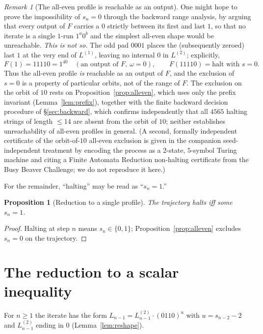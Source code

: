 \documentclass[11pt,reqno]{amsart}
\theoremstyle{plain}
\newtheorem{proposition}{Proposition}
\theoremstyle{definition}
\theoremstyle{remark}
\newtheorem{remark}{Remark}
\begin{document}
\begin{remark}[The all-even profile is reachable as an output]\label{rem:rem18}
One might hope to prove the impossibility of $s_n=0$ through the backward range analysis, by arguing that every output of $F$ carries a $0$ strictly between its first and last $1$, so that no iterate is a single $1$-run $1^a0^b$ and the simplest all-even shape would be unreachable. \emph{This is not so.} The odd pad $0001$ places the (subsequently zeroed) last $1$ at the very end of $L^{(1)}$, leaving no internal $0$ in $L^{(2)}$; explicitly,
\[ F(1)=11110=1^40\quad(\text{an output of }F,\ \omega=0),\qquad F(11110)=\text{halt with }s=0. \]
Thus the all-even profile \emph{is} reachable as an output of $F$, and the exclusion of $s=0$ is a property of particular orbits, not of the range of $F$. The exclusion on the orbit of $10$ rests on Proposition~\ref{prop:alleven}, which uses only the prefix invariant (Lemma~\ref{lem:prefix}), together with the finite backward decision procedure of \S\ref{sec:backward}, which confirms independently that all $4565$ halting strings of length $\le 14$ are absent from the orbit of $10$; neither establishes unreachability of all-even profiles in general. (A second, formally independent certificate of the orbit-of-$10$ all-even exclusion is given in the companion seed-independent treatment by encoding the process as a $2$-state, $5$-symbol Turing machine and citing a Finite Automata Reduction non-halting certificate from the Busy Beaver Challenge; we do not reproduce it here.)
\end{remark}

For the remainder, ``halting'' may be read as ``$s_n=1$.''

\begin{proposition}[Reduction to a single profile]\label{prop:single}
The trajectory halts iff some $s_n=1$.
\end{proposition}
\begin{proof}
Halting at step $n$ means $s_n\in\{0,1\}$; Proposition~\ref{prop:alleven} excludes $s_n=0$ on the trajectory.
\end{proof}

\section{The reduction to a scalar inequality}\label{sec:reduction}
For $n\ge 1$ the iterate has the form $L_{n-1}=L^{(2)}_{n-1}\cdot(0110)^u$ with $u=s_{n-2}-2$ and $L^{(2)}_{n-1}$ ending in $0$ (Lemma~\ref{lem:reshape}).
\end{document}
